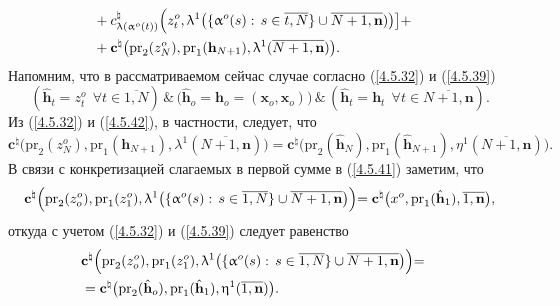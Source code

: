 \documentclass[11pt,twoside,openany]{report}
\newcommand{\bfn}{\begin{equation}}
\newcommand{\efn}{\end{equation}}
\newcommand{\ov}{\overline}
\newcommand{\la}{\lambda}
\newcommand{\al}{\alpha}
\newcommand{\fa}{\forall}
\begin{document}
{{\begin{eqnarray}
&+ c_{\la(\al^o(t))}^\natural\Bigl(z_t^o,\la^1\bigl(\{\al^o(s):\,s\in \ov{t,N}\}\cup\ov{N+1,\mathbf{n}})\bigl)\bigl]+
&\nonumber\\
&+\mathbf{c}^\natural\bigl(\mathrm{pr}_2(z_N^o),\mathrm{pr}_1(\mathbf{h}_{N+1}),\la^1(\ov{N+1,\mathbf{n}})\bigl).
&\label{4.5.41}
\end{eqnarray}
Напомним, что в рассматриваемом сейчас случае согласно (\ref{4.5.32}) и (\ref{4.5.39})
\bfn\label{4.5.42}
(\hat{\mathbf{h}}_t = z_t^o\ \ \fa t\in \ov{1,N})\,\&\,\bigl(\hat{\mathbf{h}}_o = \mathbf{h}_o =
(\mathbf{x}_o,\mathbf{x}_o)\bigl)\,\&\,(\hat{\mathbf{h}}_t = \mathbf{h}_t\ \ \fa t\in \ov{N+1,\mathbf{n}}).
\efn
Из (\ref{4.5.32}) и (\ref{4.5.42}), в частности, следует, что
\bfn\label{4.5.43}
\mathbf{c}^\natural\bigl(\mathrm{pr}_2(z_N^o),\mathrm{pr}_1(\mathbf{h}_{N+1}),
\la^1(\ov{N+1,\mathbf{n}})\bigl) = \mathbf{c}^\natural\bigl(\mathrm{pr}_2(\hat{\mathbf{h}}_N),
\mathrm{pr}_1(\hat{\mathbf{h}}_{N+1}),
\eta^1(\ov{N+1,\mathbf{n}})\bigl).
\efn
В связи с конкретизацией слагаемых в первой сумме в (\ref{4.5.41}) заметим, что
$$
\mathbf{c}^\natural\Bigl(\mathrm{pr}_2(z_o^o),\mathrm{pr}_1(z_1^o), \la^1\bigl(\{\al^o(s):\,s\in
\ov{1,N}\}\cup \ov{N+1,\mathbf{n}}\bigl)\Bigl) =
\mathbf{c}^\natural\bigl(x^o,\mathrm{pr}_1(\hat{\mathbf{h}}_1),\ov{1,\mathbf{n}}\bigl),
$$
откуда с учетом (\ref{4.5.32}) и (\ref{4.5.39}) следует равенство
\begin{eqnarray}
&\mathbf{c}^\natural\Bigl(\mathrm{pr}_2(z_o^o),\mathrm{pr}_1(z_1^o),
\la^1\bigl(\{\al^o(s):\,s\in \ov{1,N}\}\cup \ov{N+1,\mathbf{n}}\bigl)\Bigl) =
&\nonumber\\
&= \mathbf{c}^\natural\bigl(\mathrm{pr}_2(\hat{\mathbf{h}}_o),\mathrm{pr}_1(\hat{\mathbf{h}}_1),
 \eta^1(\ov{1,\mathbf{n}})\bigl).
&\label{4.5.43`}
\end{eqnarray}

}}
\end{document}
